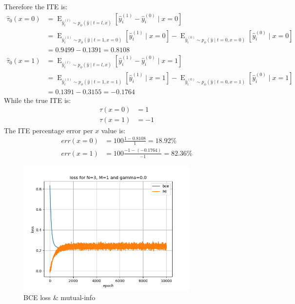 \documentclass[oneside,12pt]{article}
\begin{document}
%
Therefore the ITE is:
%
\begin{equation}
    \begin{split}
        \hat{\tau}_0(x=0) &= \operatorname{E}_{\hat{y}_i^{(l)} \sim p_\phi(\hat{y} \mid t=l,x)}\left[\hat{y}_i^{(1)}-\hat{y}_i^{(0)} \mid x=0 \right]\\
        &= \operatorname{E}_{\hat{y}_i^{(1)} \sim p_\phi(\hat{y} \mid t=1,x=0)}\left[\hat{y}_i^{(1)} \mid x=0 \right] - \operatorname{E}_{\hat{y}_i^{(0)} \sim p_\phi(\hat{y} \mid t=0,x=0)}\left[\hat{y}_i^{(0)} \mid x=0 \right]\\
        &= 0.9499 - 0.1391 = 0.8108\\
        \hat{\tau}_0(x=1) &= \operatorname{E}_{\hat{y}_i^{(l)} \sim p_\phi(\hat{y} \mid t=l,x)}\left[\hat{y}_i^{(1)}-\hat{y}_i^{(0)} \mid x=1 \right]\\
        &= \operatorname{E}_{\hat{y}_i^{(1)} \sim p_\phi(\hat{y} \mid t=1,x=1)}\left[\hat{y}_i^{(1)} \mid x=1 \right] - \operatorname{E}_{\hat{y}_i^{(0)} \sim p_\phi(\hat{y} \mid t=0,x=1)}\left[\hat{y}_i^{(0)} \mid x=1 \right]\\
        &= 0.1391 - 0.3155 = -0.1764    
    \end{split}
\end{equation}
%
While the true ITE is:
\begin{equation}
    \begin{split}
        \tau(x=0) &= 1\\
        \tau(x=1) &= -1
    \end{split}
\end{equation}
%
The ITE percentage error per $x$ value is:
%
\begin{equation}
    \begin{split}
        err(x=0) &= 100\frac{1-0.8108}{1} = 18.92 \%\\
        err(x=1) &= 100\frac{-1-(-0.1764)}{-1} = 82.36 \%
    \end{split}
\end{equation}
%
\begin{figure}
    \centering
        \includegraphics[width=0.8\textwidth]{./gamma_0}
        \caption{\label{fig:gamma_0}BCE loss \& mutual-info}
\end{figure}
\end{document}
